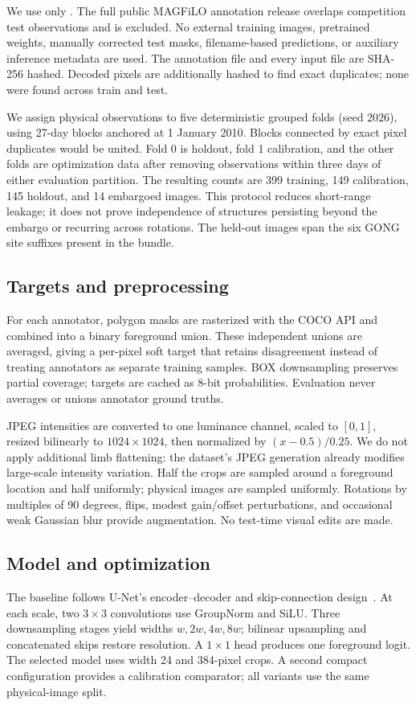 \documentclass[sigconf]{acmart}
\begin{document}
We use only . The full public MAGFiLO annotation release overlaps competition test observations and is excluded. No external training images, pretrained weights, manually corrected test masks, filename-based predictions, or auxiliary inference metadata are used. The annotation file and every input file are SHA-256 hashed. Decoded pixels are additionally hashed to find exact duplicates; none were found across train and test.

We assign physical observations to five deterministic grouped folds (seed 2026), using 27-day blocks anchored at 1 January 2010. Blocks connected by exact pixel duplicates would be united. Fold 0 is holdout, fold 1 calibration, and the other folds are optimization data after removing observations within three days of either evaluation partition. The resulting counts are 399 training, 149 calibration, 145 holdout, and 14 embargoed images. This protocol reduces short-range leakage; it does not prove independence of structures persisting beyond the embargo or recurring across rotations. The held-out images span the six GONG site suffixes present in the bundle.

\subsection{Targets and preprocessing}
For each annotator, polygon masks are rasterized with the COCO API and combined into a binary foreground union. These independent unions are averaged, giving a per-pixel soft target that retains disagreement instead of treating annotators as separate training samples. BOX downsampling preserves partial coverage; targets are cached as 8-bit probabilities. Evaluation never averages or unions annotator ground truths.

JPEG intensities are converted to one luminance channel, scaled to $[0,1]$, resized bilinearly to $1024\times1024$, then normalized by $(x-0.5)/0.25$. We do not apply additional limb flattening: the dataset's JPEG generation already modifies large-scale intensity variation. Half the crops are sampled around a foreground location and half uniformly; physical images are sampled uniformly. Rotations by multiples of 90 degrees, flips, modest gain/offset perturbations, and occasional weak Gaussian blur provide augmentation. No test-time visual edits are made.

\subsection{Model and optimization}
The baseline follows U-Net's encoder--decoder and skip-connection design~\cite{unet}. At each scale, two $3\times3$ convolutions use GroupNorm and SiLU. Three downsampling stages yield widths $w,2w,4w,8w$; bilinear upsampling and concatenated skips restore resolution. A $1\times1$ head produces one foreground logit. The selected model uses width 24 and 384-pixel crops. A second compact configuration provides a calibration comparator; all variants use the same physical-image split.
\end{document}
